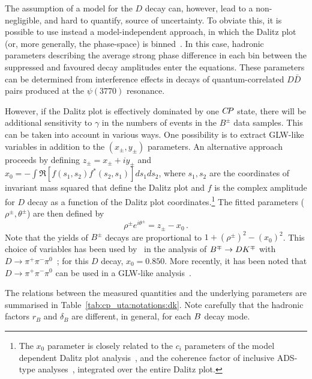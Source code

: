 The assumption of a model for the $D$ decay can, however, lead to a non-negligible, and hard to quantify, source of uncertainty.
To obviate this, it is possible to use instead a model-independent approach, in which the Dalitz plot (or, more generally, the phase-space) is binned~\cite{Giri:2003ty,Bondar:2005ki,Bondar:2008hh}.
In this case, hadronic parameters describing the average strong phase difference in each bin between the suppressed and favoured decay amplitudes enter the equations.
These parameters can be determined from interference effects in decays of quantum-correlated $D\bar{D}$ pairs produced at the $\psi(3770)$ resonance.

However, if the Dalitz plot is effectively dominated by one $C\!P$ state,
there will be additional sensitivity to $\gamma$ in the numbers of events
in the $B^\pm$ data samples.
This can be taken into account in various ways.
One possibility is to extract GLW-like variables 
in addition to the $\left( x_\pm, y_\pm \right)$ parameters.
An alternative approach proceeds by defining $z_\pm = x_\pm + i y_\pm$
and $x_0 = - \int \Re \left[ f(s_1,s_2)f^*(s_2,s_1) \right] ds_1ds_2$,
where $s_1, s_2$ are the coordinates of invariant mass squared that
define the Dalitz plot and $f$ is the complex amplitude for $D$ decay
as a function of the Dalitz plot coordinates.\footnote{
  The $x_0$ parameter is closely related to the $c_i$ parameters of 
  the model dependent Dalitz plot analysis~\cite{Giri:2003ty,Bondar:2005ki,Bondar:2008hh},
  and the coherence factor of inclusive ADS-type analyses~\cite{Atwood:2003mj},
  integrated over the entire Dalitz plot.
}
The fitted parameters ($\rho^\pm, \theta^\pm$) are then defined by
\begin{equation}
  \rho^\pm e^{i \theta^\pm} = z_\pm - x_0 \, .
\end{equation}
Note that the yields of $B^\pm$ decays are proportional 
to $1 + (\rho^\pm)^2 - (x_0)^2$. 
This choice of variables has been used by \babar\ in the analysis of
$B^\mp \to DK^\mp$ with $D \to \pi^+\pi^-\pi^0$~\cite{Aubert:2007ii};
for this $D$ decay, $x_0 = 0.850$.
More recently, it has been noted that $D \to \pi^+\pi^-\pi^0$ can be used in a
GLW-like analysis~\cite{Nayak:2014tea}.

The relations between the measured quantities and the
underlying parameters are summarised in Table~\ref{tab:cp_uta:notations:dk}.
Note carefully that the hadronic factors $r_B$ and $\delta_B$ 
are different, in general, for each $B$ decay mode.


